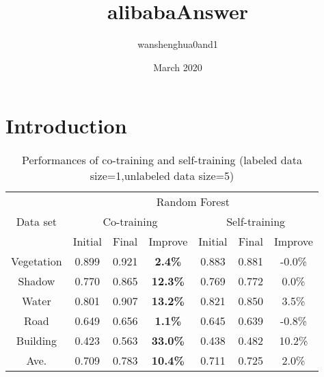 \documentclass{article}
\title{alibabaAnswer}
\author{wanshenghua0and1 }
\date{March 2020}
\begin{document}
\maketitle

\section{Introduction}


\begin{table}[]
\begin{center}
\begin{tabular}{c|ccc|ccc}
\toprule
\multirow{3}{*}{Data set} & \multicolumn{6}{c}{Random Forest}                                  \\
\cline{2-7}
                          & \multicolumn{3}{c|}{Co-training}      & \multicolumn{3}{c}{Self-training} \\
\cline{2-7}
                          & Initial & Final & Improve         & Initial   & Final   & Improve  \\
\midrule
Vegetation                & 0.899    & 0.921  & \textbf{2.4\%}  & 0.883      & 0.881    & -0.0\%   \\
Shadow                    & 0.770    & 0.865  & \textbf{12.3\%} & 0.769      & 0.772    & 0.0\%   \\
Water                     & 0.801    & 0.907  & \textbf{13.2\%} & 0.821      & 0.850    & 3.5\%   \\
Road                      & 0.649    & 0.656  & \textbf{1.1\%}  & 0.645      & 0.639    & -0.8\%    \\
Building                  & 0.423    & 0.563  & \textbf{33.0\%} & 0.438      & 0.482    & 10.2\%    \\
\midrule
Ave.                      & 0.709    & 0.783  & \textbf{10.4\%} & 0.711      & 0.725    & 2.0\%   \\
\bottomrule
\end{tabular}
\caption{Performances of co-training and self-training (labeled data size=1,unlabeled data size=5)}
\end{center}
\end{table}
\end{document}
